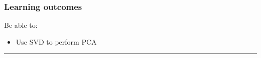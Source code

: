  





\subsubsection*{Learning outcomes}
Be able to:
\begin{itemize}
	\item Use SVD to perform PCA
\end{itemize}





\rule[0.01in]{\textwidth}{0.0025in}

